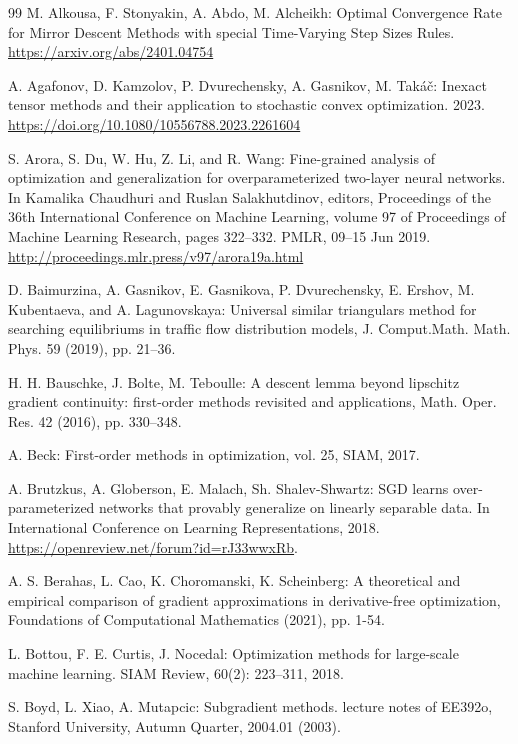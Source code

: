 \documentclass[11pt]{amsart}
\theoremstyle{definition}
\numberwithin{equation}{section}
\begin{document}
\begin{thebibliography}{99}
M. Alkousa, F. Stonyakin, A. Abdo, M. Alcheikh: Optimal Convergence Rate for Mirror Descent Methods  with special Time-Varying Step Sizes Rules. \url{https://arxiv.org/abs/2401.04754}

A. Agafonov, D. Kamzolov, P. Dvurechensky, A. Gasnikov, M. Takáč: Inexact tensor methods and their application to stochastic convex optimization. 2023.  \url{https://doi.org/10.1080/10556788.2023.2261604}

S. Arora, S. Du, W. Hu, Z. Li, and R. Wang: Fine-grained analysis of optimization and generalization for overparameterized two-layer neural networks. In Kamalika Chaudhuri and Ruslan Salakhutdinov, editors, Proceedings of the 36th International Conference on Machine Learning, volume 97 of Proceedings of Machine Learning Research, pages 322–332. PMLR, 09–15 Jun 2019. \url{http://proceedings.mlr.press/v97/arora19a.html}

D. Baimurzina, A. Gasnikov, E. Gasnikova, P. Dvurechensky, E. Ershov, M. Kubentaeva, and A. Lagunovskaya: Universal similar triangulars method for searching equilibriums in traffic flow distribution models, J. Comput.Math. Math. Phys. 59 (2019), pp. 21–36.

H. H. Bauschke, J. Bolte, M. Teboulle: A descent lemma beyond lipschitz gradient continuity: first-order methods revisited and applications, Math. Oper. Res. 42 (2016), pp. 330–348.

A. Beck: First-order methods in optimization, vol. 25, SIAM, 2017.

A. Brutzkus, A. Globerson, E. Malach, Sh. Shalev-Shwartz: SGD learns over-parameterized networks that provably generalize on linearly separable data. In International Conference on Learning Representations, 2018.  \url{https://openreview.net/forum?id=rJ33wwxRb}.

A. S. Berahas, L. Cao, K. Choromanski, K. Scheinberg: A theoretical and empirical comparison of gradient approximations in derivative-free optimization, Foundations of Computational Mathematics (2021), pp. 1-54.

L. Bottou, F. E. Curtis, J. Nocedal: Optimization methods for large-scale machine learning. SIAM Review, 60(2): 223–311, 2018. 

S. Boyd, L. Xiao, A. Mutapcic: Subgradient methods. lecture notes of EE392o, Stanford University, Autumn Quarter, 2004.01 (2003).


\end{thebibliography}
\end{document}
